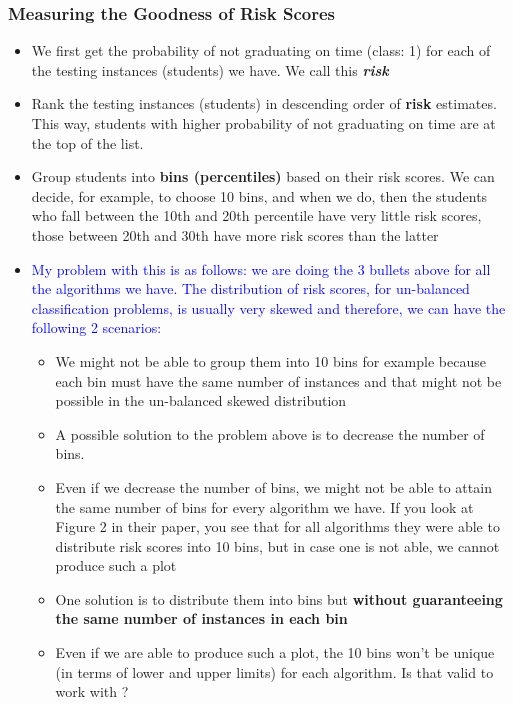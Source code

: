 \documentclass[11pt]{article}
\begin{document}
\subsubsection{Measuring the Goodness of Risk Scores}
\begin{itemize}
\item We first get the probability of not graduating on time (class: 1) for each of the testing instances (students) we have. We call this \textbf{\textit{risk}}

\item Rank the testing instances (students) in descending order of \textbf{risk} estimates. This way, students with higher probability of not graduating on time are at the top of the list.

\item Group students into \textbf{bins (percentiles)} based on their risk scores. We can decide, for example, to choose 10 bins, and when we do, then the students who fall between the 10th and 20th percentile have very little risk scores, those between 20th and 30th have more risk scores than the latter

\item \textcolor{blue}{My problem with this is as follows: we are doing the 3 bullets above for all the algorithms we have. The distribution of risk scores, for un-balanced classification problems, is usually very skewed and therefore, we can have the following 2 scenarios:}
\begin{itemize}
\item We might not be able to group them into 10 bins for example because each bin must have the same number of instances and that might not be possible in the un-balanced skewed distribution
\item A possible solution to the problem above is to decrease the number of bins.
\item Even if we decrease the number of bins, we might not be able to attain the same number of bins for every algorithm we have. If you look at Figure 2 in their paper, you see that for all algorithms they were able to distribute risk scores into 10 bins, but in case one is not able, we cannot produce such a plot
\item One solution is to distribute them into bins but \textbf{without guaranteeing the same number of instances in each bin  }
\item Even if we are able to produce such a plot, the 10 bins won't be unique (in terms of lower and upper limits) for each algorithm. Is that valid to work with ?
\end{itemize}


\end{itemize}
\end{document}
